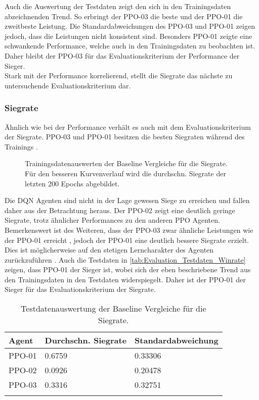 \newpage
Auch die Auswertung der Testdaten  zeigt den sich in den Trainingsdaten abzeichnenden Trend. So erbringt der PPO-03 die beste und der PPO-01 die zweitbeste Leistung. Die Standardabweichungen des PPO-03 und PPO-01 zeigen jedoch, dass die Leistungen nicht konsistent sind. Besonders PPO-01 zeigte eine schwankende Performance, welche auch in den Trainingsdaten  zu beobachten ist.
Daher bleibt der PPO-03 für das Evaluationskriterium der Performance der Sieger.\\
Stark mit der Performance korrelierend, stellt die Siegrate das nächste zu untersuchende Evaluationskriterium dar.

\subsubsection{Siegrate} \label{subsubsec:Evaluation_Siegrate}
Ähnlich wie bei der Performance verhält es auch mit dem Evaluationskriterium der Siegrate. PPO-03 und PPO-01 besitzen die besten Siegraten während des Trainings .
\begin{figure}[H]
	\centering
	
	\caption[Siegrate- Auswertung der Trainingsdaten der Baseline Vergleiche]{Trainingsdatenauswerten der Baseline Vergleiche für die Siegrate. Für den besseren Kurvenverlauf wird die durchschn. Siegrate der letzten 200 Epochs abgebildet.}
	\label{fig:Evaluation_Baseline_winrate}
\end{figure}
Die DQN Agenten sind nicht in der Lage gewesen Siege zu erreichen und fallen daher aus der Betrachtung heraus.
Der PPO-02 zeigt eine deutlich geringe Siegrate, trotz ähnlicher Performances zu den anderen PPO Agenten.
Bemerkenswert ist des Weiteren, dass der PPO-03 zwar ähnliche Leistungen wie der PPO-01 erreicht , jedoch der PPO-01 eine deutlich bessere Siegrate erzielt. Dies ist möglicherweise auf den stetigen Lerncharakter des Agenten zurückzuführen .
Auch die Testdaten in \autoref{tab:Evaluation_Testdaten_Winrate} zeigen, dass PPO-01 der Sieger ist, wobei sich der eben beschriebene Trend aus den Trainingsdaten in den Testdaten widerspiegelt. Daher ist der PPO-01 der Sieger für das Evaluationskriterium der Siegrate.
\newpage
\begin{longtable}[H]{|p{4.5cm}|p{4.5cm}|p{4.5cm}|}
	\hline
	Agent & Durchschn. Siegrate & Standardabweichung \\
	\hline
	PPO-01 & 0.6759 & 0.33306 \\
	\hline
	PPO-02 & 0.0926 & 0.20478 \\
	\hline
	PPO-03 & 0.3316 & 0.32751 \\
	\hline
	\caption{Testdatenauswertung der Baseline Vergleiche für die Siegrate.}
	\label{tab:Evaluation_Testdaten_Winrate} 
\end{longtable}

